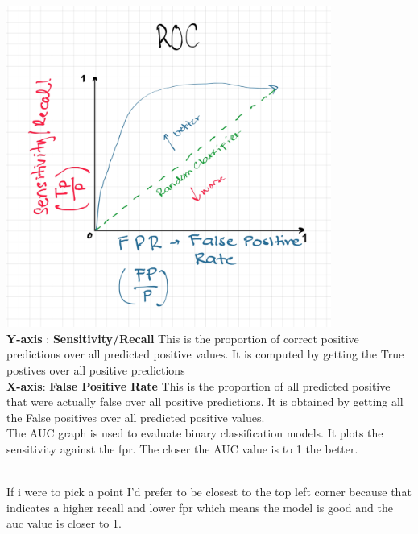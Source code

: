 \documentclass[12pt]{article}
\begin{document}
\begin{enumerate}
\newpage

 \\ \\ 

    \includegraphics[width=0.8\textwidth]{roc.png} \\ 
    \textbf{Y-axis} : \textbf{Sensitivity/Recall} This is the proportion of correct positive predictions over all predicted positive values. It is computed by getting the True postives over all positive predictions \\ 
    \textbf{X-axis}: \textbf{False Positive Rate} This is the proportion of all predicted positive that were actually false over all positive predictions. It is obtained by getting all the False positives over all predicted positive values. \\ 

    The AUC graph is used to evaluate binary classification models. It plots the sensitivity against the fpr. The closer the AUC value is to 1 the better. 

 \\ 
If i were to pick a point I'd prefer to be closest to the top left corner because that indicates a higher recall and lower fpr which means the model is good and the auc value is closer to 1.


\end{enumerate}
\end{document}
